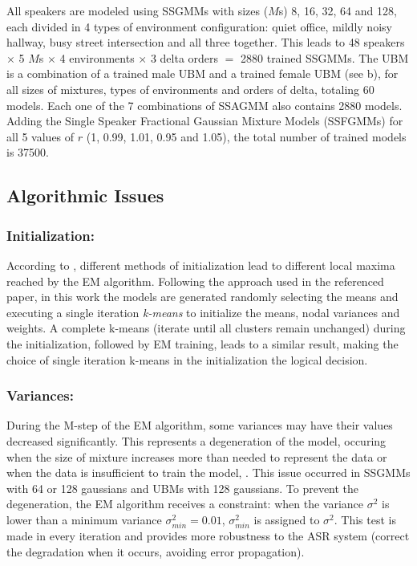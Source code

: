 All speakers are modeled using SSGMMs with sizes ($M$s) 8, 16, 32, 64 and 128, each divided in 4 types of environment configuration: quiet office, mildly noisy hallway, busy street intersection and all three together. This leads to 48 speakers $\times$ 5 $M$s $\times$ 4 environments $\times$ 3 delta orders $=$ 2880 trained SSGMMs. The UBM is a combination of a trained male UBM and a trained female UBM (see b), for all sizes of mixtures, types of environments and orders of delta, totaling 60 models. Each one of the 7 combinations of SSAGMM also contains 2880 models. Adding the Single Speaker Fractional Gaussian Mixture Models (SSFGMMs) for all 5 values of $r$ (1, 0.99, 1.01, 0.95 and 1.05), the total number of trained models is 37500.

\subsection{Algorithmic Issues}

\subsubsection{Initialization:}

According to , different methods of initialization lead to different local maxima reached by the EM algorithm. Following the approach used in the referenced paper, in this work the models are generated randomly selecting the means and executing a single iteration \emph{k-means} to initialize the means, nodal variances and weights. A complete k-means (iterate until all clusters remain unchanged) during the initialization, followed by EM training, leads to a similar result, making the choice of single iteration k-means in the initialization the logical decision.

\subsubsection{Variances:}

During the M-step of the EM algorithm, some variances may have their values decreased significantly. This represents a degeneration of the model, occuring when the size of mixture increases more than needed to represent the data or when the data is insufficient to train the model, . This issue occurred in SSGMMs with 64 or 128 gaussians and UBMs with 128 gaussians. To prevent the degeneration, the EM algorithm receives a constraint: when the variance $\sigma^2$ is lower than a minimum variance $\sigma_{min}^2 = 0.01$, $\sigma_{min}^2$ is assigned to $\sigma^2$. This test is made in every iteration and provides more robustness to the ASR system (correct the degradation when it occurs, avoiding error propagation).


